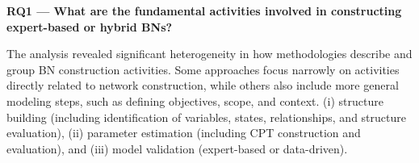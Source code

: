 \begin{tcolorbox}[
    colback=gray!5,
    colframe=black,
    boxrule=0.5pt,
    arc=2pt,
    left=6pt,
    right=6pt,
    top=6pt,
    bottom=6pt
]
\textbf{RQ1 --- What are the fundamental activities involved in constructing expert-based or hybrid BNs?}

The analysis revealed significant heterogeneity in how methodologies describe and group BN construction activities. Some approaches focus narrowly on activities directly related to network construction, while others also include more general modeling steps, such as defining objectives, scope, and context. 
(i) structure building (including identification of variables, states, relationships, and structure evaluation),
(ii) parameter estimation (including CPT construction and evaluation), and
(iii) model validation (expert-based or data-driven).

\end{tcolorbox}
